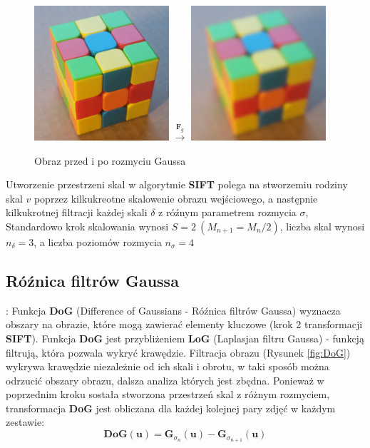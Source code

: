    \begin{figure}[h]
      \centering
      \includegraphics[width=5cm]{origin.jpg}
      \Large{$ \xrightarrow{\mathbf{F}_{g}} $}
      \includegraphics[width=5cm]{Gauss_blur.jpg}
      \caption{Obraz przed i po rozmyciu Gaussa}
      \label {fig:gauss_blur}
   \end{figure}

   Utworzenie przestrzeni skal w algorytmie \textbf{SIFT} polega na stworzemiu rodziny skal $v$ poprzez kilkukreotne skalowenie obrazu wejściowego, a następnie kilkukrotnej filtracji każdej skali $\delta$ z róźnym parametrem rozmycia $\sigma$,
   Standardowo krok skalowania wynosi $ S = 2 \: (M_{n+1} = M_{n} / 2)$, liczba skal wynosi $ n_{\delta} = 3$, a liczba poziomów rozmycia $ n_{\sigma} = 4$

\subsection{Róźnica filtrów Gaussa}:
   Funkcja \textbf{DoG} (Difference of Gaussians - Róźnica filtrów Gaussa) wyznacza obszary na obrazie, które mogą zawierać elementy kluczowe (krok 2 transformacji \textbf{SIFT}). Funkcja \textbf{DoG} jest przybliżeniem \textbf{LoG} (Laplasjan filtru Gaussa) - funkcją filtrują, która pozwala wykryć krawędzie. Filtracja obrazu (Rysunek \ref{fig:DoG})  wykrywa krawędzie niezależnie od ich skali i obrotu, w taki sposób można odrzucić obszary obrazu, dalsza analiza których jest zbędna. Ponieważ w poprzednim kroku sostała stworzona przestrzeń skal z różnym rozmyciem, transformacja \textbf{DoG} jest obliczana dla każdej kolejnej pary zdjęć w każdym zestawie:
   \begin{equation} \label{eq:DoG}
      \mathbf{DoG}(\mathbf{u}) = \mathbf{G}_{\sigma_n}(\mathbf{u}) - \mathbf{G}_{\sigma_{n+1}}(\mathbf{u})
   \end{equation}

